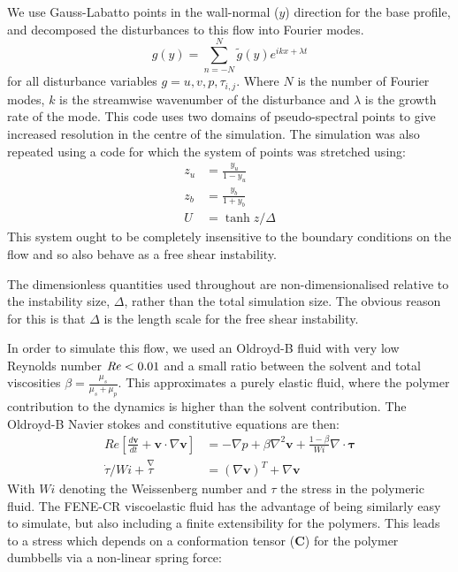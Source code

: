 \documentclass{jfm}
\newcommand{\dt}[1]{\frac{d #1}{d t}} %
\newcommand\Rey{\mbox{\textit{Re}}}  %
\begin{document}
We use Gauss-Labatto points in the wall-normal ($y$) direction for the base profile, and decomposed the disturbances to this flow into Fourier modes.
\begin{equation}
    g(y) = \sum\limits_{n=-N}^{N} \widetilde{g}(y) e^{ikx + \lambda t}
\end{equation}
for all disturbance variables $g = u, v, p, \tau_{i,j}$. Where $N$ is the number of Fourier modes, $k$ is the streamwise wavenumber of the disturbance and $\lambda$ is the growth rate of the mode. This code uses two domains of pseudo-spectral points to give increased resolution in the centre of the simulation. The simulation was also repeated using a code for which the system of points was stretched using:
\begin{align}
    z_{u} &= \frac{y_{u}}{1-y_{u}} \\
    z_{b} &= \frac{y_{b}}{1+y_{b}} \\
    U     &= \tanh{z/\Delta} 
    \label{eq:KH_inf_profile}
\end{align}
This system ought to be completely insensitive to the boundary conditions on the flow and so also behave as a free shear instability. 

The dimensionless quantities used throughout are non-dimensionalised relative to the instability size, $\Delta$, rather than the total simulation size. The obvious reason for this is that $\Delta$ is the length scale for the free shear instability.

In order to simulate this flow, we used an Oldroyd-B fluid with very low Reynolds number $\Rey < 0.01$ and a small ratio between the solvent and total viscosities $\beta = \frac{\mu_{s}}{\mu_{s}+\mu_{p}}$. This approximates a purely elastic fluid, where the polymer contribution to the dynamics is higher than the solvent contribution. The Oldroyd-B Navier stokes and constitutive equations are then:
\begin{align}
    Re \left[ \dt{\mathbf{v}} + \mathbf{v} \cdot \nabla  \mathbf{v} \right] &= - \nabla p + \beta \nabla^{2} \mathbf{v} + \frac{1-\beta}{Wi} \nabla \cdot \mathbf{\tau} \\
    \dot{\tau}/Wi + \overset{\nabla}\tau &= \left(\nabla \mathbf{v}\right)^{T} + \nabla{\mathbf{v}}
\end{align}
With $Wi$ denoting the Weissenberg number and $\tau$ the stress in the polymeric fluid. The FENE-CR viscoelastic fluid has the advantage of being similarly easy to simulate, but also including a finite extensibility for the polymers. This leads to a stress which depends on a conformation tensor ($\mathbf{C}$) for the polymer dumbbells via a non-linear spring force:
\end{document}
